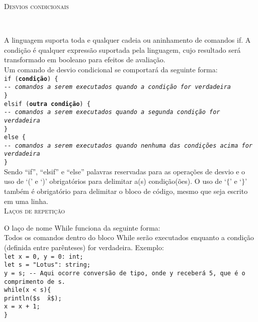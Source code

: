 \documentclass[12pt,a4paper]{article}
\def\emph#1{\textbf{#1}} %
\begin{document}
\hypertarget{label4}{\Large{\textsc{Desvios condicionais}}}\\
\normalsize

A linguagem suporta toda e qualquer cadeia ou aninhamento de comandos if. A condição é qualquer expressão suportada pela linguagem, cujo resultado será transformado em booleano para efeitos de avaliação.\\

Um comando de desvio condicional se comportará da seguinte forma: \\

\noindent\texttt{if (\emph{condição}) \{\\
\indent\textit{-{}- comandos a serem executados quando a condição for verdadeira} \\
\} \\
elsif (\emph{outra condição}) \{\\
\indent\textit{-{}- comandos a serem executados quando a segunda condição for verdadeira} \\
\} \\
else \{\\
\indent\textit{-{}- comandos a serem executados quando nenhuma das condições acima for verdadeira} \\
\}}\\

Sendo ``if'', ``elsif'' e ``else'' palavras reservadas para as operações de desvio e o uso de `(' e `)' obrigatórios para delimitar a(s) condição(ões). O uso de `$\{$' e `$\}$' também é obrigatório para delimitar o bloco de código, mesmo que seja escrito em uma linha.\\[0.3cm]


\hypertarget{label5}{\Large{\textsc{Laços de repetição}}}\\
\normalsize

O laço de nome While funciona da seguinte forma: \\

Todos os comandos dentro do bloco While serão executados enquanto a condição (definida entre parênteses) for verdadeira. Exemplo: \\[0.25cm]
\texttt{\noindent let x = 0, y = 0: int;\\
\noindent let s = "Lotus": string;\\
\noindent y = s; -{}- Aqui ocorre conversão de tipo, onde y receberá 5, que é o comprimento de s. \\[0.2cm]
\noindent while(x < s)\{\\
\indent println(\$s \^\ x\$);\\
\indent x = x + 1;\\
\}}\\[0.6cm]
\end{document}
